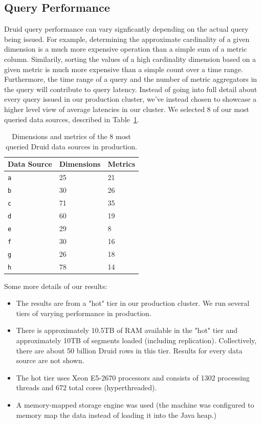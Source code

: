 \documentclass{acm_proc_article-sp}
\begin{document}
\subsection{Query Performance}
Druid query performance can vary signficantly depending on the actual query
being issued. For example, determining the approximate cardinality of a given
dimension is a much more expensive operation than a simple sum of a metric
column. Similarily, sorting the values of a high cardinality dimension based on
a given metric is much more expensive than a simple count over a time range.
Furthermore, the time range of a query and the number of metric aggregators in
the query will contribute to query latency. Instead of going into full detail
about every query issued in our production cluster, we've instead chosen to
showcase a higher level view of average latencies in our cluster. We selected 8
of our most queried data sources, described in Table~\ref{tab:datasources}. 

\begin{table}
  \centering
  \caption{Dimensions and metrics of the 8 most queried Druid data sources in production.}
  \label{tab:datasources}
  \begin{tabular}{| l | l | l |}
    \hline
    \textbf{Data Source} & \textbf{Dimensions} & \textbf{Metrics} \\ \hline
    \texttt{a} & 25 & 21 \\ \hline
    \texttt{b} & 30 & 26 \\ \hline
    \texttt{c} & 71 & 35 \\ \hline
    \texttt{d} & 60 & 19 \\ \hline
    \texttt{e} & 29 & 8 \\ \hline
    \texttt{f} & 30 & 16 \\ \hline
    \texttt{g} & 26 & 18 \\ \hline
    \texttt{h} & 78 & 14 \\ \hline
  \end{tabular}
\end{table}

Some more details of our results:

\begin{itemize}
\item The results are from a "hot" tier in our production cluster. We run several tiers of varying performance in production.
\item There is approximately 10.5TB of RAM available in the "hot" tier and approximately 10TB of segments loaded (including replication). Collectively, there are about 50 billion Druid rows in this tier. Results for every data source are not shown.
\item The hot tier uses Xeon E5-2670 processors and consists of 1302 processing threads and 672 total cores (hyperthreaded).
\item A memory-mapped storage engine was used (the machine was configured to memory map the data
  instead of loading it into the Java heap.)
\end{itemize}
\end{document}
